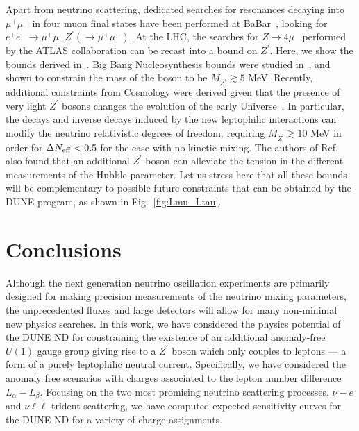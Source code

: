 Apart from neutrino scattering, dedicated searches for resonances decaying into $\mu^+ \mu^-$ in four muon final states have been performed at BaBar~\cite{TheBABAR:2016rlg}, looking for $e^+ e^- \to \mu^+\mu^- Z^\prime (\to \mu^+ \mu^-)$. At the LHC, the searches for $Z \to 4 \mu$~\cite{Aad:2014wra} performed by the ATLAS collaboration can be recast into a bound on $Z^\prime$. Here, we show the bounds derived in~\cite{Altmannshofer2014}. Big Bang Nucleosynthesis bounds were studied in~\cite{Kamada:2015era,Kamada:2018zxi}, and shown to constrain the mass of the boson to be $M_{Z^\prime} \gtrsim 5$ MeV. Recently, additional constraints from Cosmology were derived given that the presence of very light $Z^\prime$ bosons changes the evolution of the early Universe~\cite{Escudero:2019gzq}. In particular, the decays and inverse decays induced by the new leptophilic interactions can modify the neutrino relativistic degrees of freedom, requiring $M_{Z^\prime}\gtrsim 10$ MeV in order for $\Delta N_{\rm eff} < 0.5$ for the case with no kinetic mixing. The authors of Ref.~\cite{Escudero:2019gzq} also found that an additional $Z^\prime$ boson can alleviate the tension in the different measurements of the Hubble parameter. Let us stress here that all these bounds will be complementary to possible future constraints that can be obtained by the DUNE program, as shown in Fig.~\ref{fig:Lmu_Ltau}.

\section{\label{sec:conclusion}Conclusions}

Although the next generation neutrino oscillation experiments are primarily designed for making precision measurements of the neutrino mixing parameters, the unprecedented fluxes and large detectors will allow for many non-minimal new physics searches. In this work, we have considered the physics potential of the DUNE ND for constraining the existence of an additional anomaly-free $U(1)$ gauge group giving rise to a $Z^\prime$ boson which only couples to leptons --- a form of a purely leptophilic neutral current. Specifically, we have considered the anomaly free scenarios with charges associated to the lepton number difference $L_\alpha-L_\beta$.  Focusing on the two most promising neutrino scattering processes, $\nu- e$ and $\nu\ell\ell$ trident scattering, we have computed expected sensitivity curves for the DUNE ND for a variety of charge assignments. 

